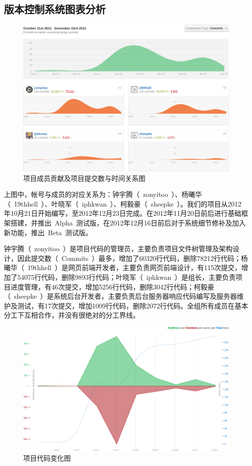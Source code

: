 \subsection{版本控制系统图表分析}
\begin{figure}[H]
   \centering \includegraphics[width=\textwidth]{img/contrib.png}
   \caption{项目成员贡献及项目提交数与时间关系图}
\end{figure}

上图中，帐号与成员的对应关系为：钟宇腾（~zonyitoo~）、杨曦华（~19thhell~）、叶晓军（~iphkwan~）、柯毅豪（~sheepke~）。我们的项目从2012年10月21日开始编写，至2012年12月23日完成。在2012年11月20日前后进行基础框架搭建，并推出~Alpha~测试版，在2012年12月16日前后对于系统细节修补及加入新功能，推出~Beta~测试版。

钟宇腾（~zonyitoo~）是项目代码的管理员，主要负责项目文件树管理及架构设计，因此提交数（~Commits~）最多，增加了60320行代码，删除78212行代码；杨曦华（~19thhell~）是网页前端开发者，主要负责网页前端设计，有115次提交，增加了54075行代码，删除9893行代码；叶晓军（~iphkwan~）是组长，主要负责项目进度管理，有46次提交，增加5256行代码，删除3042行代码；柯毅豪（~sheepke~）是系统后台开发者，主要负责后台服务器响应代码编写及服务器维护及测试，有17次提交，增加1009行代码，删除2072行代码。全组所有成员在基本分工下互相合作，并没有很绝对的分工界线。

\begin{figure}[H]
   \centering \includegraphics[width=\textwidth]{img/code_freq.png}
   \caption{项目代码变化图}
\end{figure}

